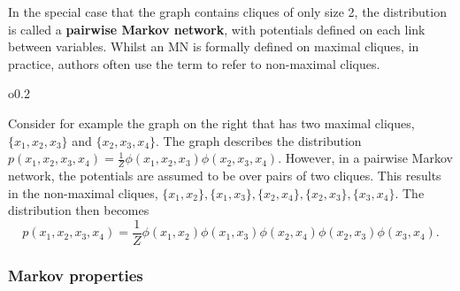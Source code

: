 \documentclass{article}
\begin{document}
In the special case that the graph contains cliques of only size 2, the distribution is called a \textbf{pairwise Markov network}, with potentials defined on each link between variables. Whilst an MN is formally defined on maximal cliques, in practice, authors often use the term to refer to non-maximal cliques. 

\begin{wrapfigure}{o}{0.2\textwidth}
    \vspace{-20pt}
    \begin{center}
    \end{center}
\end{wrapfigure}

Consider for example the graph on the right that has two maximal cliques, $\{x_1, x_2, x_3\}$ and $\{x_2, x_3, x_4\}$. The graph describes the distribution $p(x_1, x_2, x_3, x_4) = \frac{1}{Z} \phi(x_1, x_2, x_3)\phi(x_2, x_3, x_4)$. However, in a pairwise Markov network, the potentials are assumed to be over pairs of two cliques. This results in the non-maximal cliques, $\{x_1, x_2\}, \{x_1, x_3\}, \{x_2, x_4\}, \{x_2, x_3\}, \{x_3, x_4\}$. The distribution then becomes 
$$
    p(x_1, x_2, x_3, x_4) = \frac{1}{Z} \phi(x_1, x_2)\phi(x_1, x_3)\phi(x_2, x_4)\phi(x_2, x_3)\phi(x_3, x_4) .
$$

\subsubsection{Markov properties}
\end{document}
